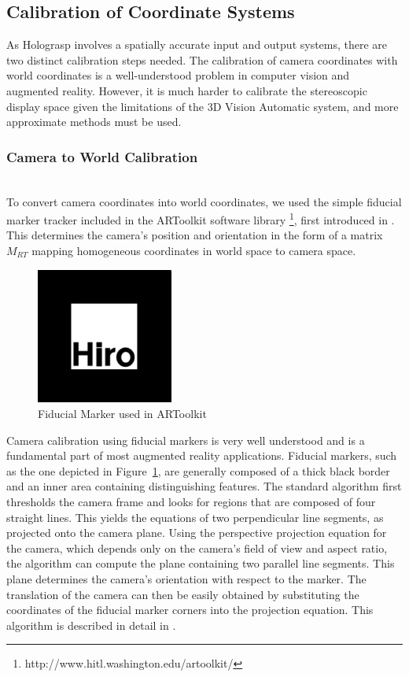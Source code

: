 \documentclass[pageno]{jpaper}
\begin{document}
\subsection{Calibration of Coordinate Systems}
As Holograsp involves a spatially accurate input and output systems, there are two distinct calibration steps needed. The calibration
of camera coordinates with world coordinates is a well-understood problem in computer vision and augmented reality.
However, it is much harder to calibrate the stereoscopic display space given the limitations of the 3D Vision Automatic
system, and more approximate methods must be used.
\subsubsection{Camera to World Calibration}$ $\\
To convert camera coordinates into world coordinates, we used the simple fiducial marker tracker included in the ARToolkit software
library \footnote{http://www.hitl.washington.edu/artoolkit/}, first introduced in \cite{artoolkit}. This determines the camera's position
and orientation in the form of a matrix $M_{RT}$ mapping homogeneous coordinates in world space to camera space.

\begin{figure}
\centering
\includegraphics[width=0.4\textwidth]{figures/hiro.png}
\caption{Fiducial Marker used in ARToolkit}
\label{fig:hiro}
\end{figure}

Camera calibration using fiducial markers is very well understood and is a fundamental part of most augmented reality applications. Fiducial
markers, such as the one depicted in Figure~\ref{fig:hiro}, are generally composed of a thick black border and an inner area
containing distinguishing features. The standard algorithm first thresholds the camera frame and looks for regions that are composed of four straight lines.
This yields the equations of two perpendicular line segments, as projected onto the camera plane. Using the perspective projection equation
for the camera, which depends only on the camera's field of view and aspect ratio, the algorithm can compute the plane containing two
parallel line segments. This plane determines the camera's orientation with respect to the marker. The translation of the camera can then be
easily obtained by substituting the coordinates of the fiducial marker corners into the projection equation. This algorithm is described in
detail in \cite{kato1999marker}.
\end{document}

